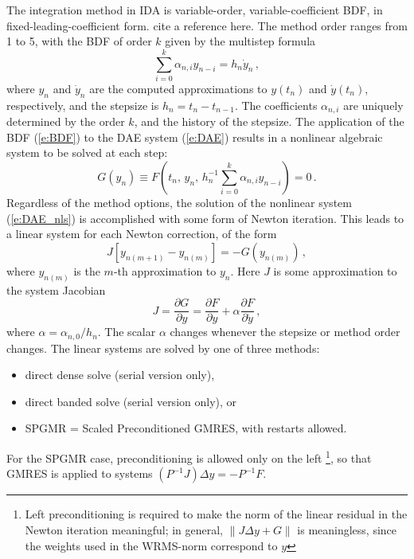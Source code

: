 The integration method in IDA is variable-order, variable-coefficient
BDF, in fixed-leading-coefficient form.  {\sf cite a reference here.} 
The method order ranges from 1 to 5, with the BDF of order $k$
given by the multistep formula
\begin{equation}\label{e:BDF}
  \sum_{i=0}^k \alpha_{n,i}y_{n-i} = h_n {\dot y}_n \, ,
\end{equation}
where $y_n$ and ${\dot y}_n$ are the computed approximations to $y(t_n)$
and ${\dot y}(t_n)$, respectively, and the stepsize is $h_n = t_n - t_{n-1}$.  
The coefficients $\alpha_{n,i}$ are uniquely determined by the order
$k$, and the history of the stepsize.  The application of the BDF
(\ref{e:BDF}) to the DAE system (\ref{e:DAE}) results in a nonlinear
algebraic system to be solved at each step:
\begin{equation}\label{e:DAE_nls}
  G(y_n) \equiv 
  F \left( t_n , \, y_n , \, 
    h_n^{-1} \sum_{i=0}^k \alpha_{n,i}y_{n-i} \right) = 0 \, .
\end{equation}
%
Regardless of the method options, the solution of the nonlinear system
(\ref{e:DAE_nls}) is accomplished with some form of Newton iteration.
This leads to a linear system for each Newton correction, of the form
\begin{equation}\label{e:DAE_Newtoncorr}
  J [y_{n(m+1)} - y_{n(m)}] = -G(y_{n(m)})  \, , 
\end{equation}
where $y_{n(m)}$ is the $m$-th approximation to $y_n$. 
%
Here $J$ is some approximation to the system Jacobian
\begin{equation}\label{e:DAE_Jacobian}
  J = \frac{\partial G}{\partial y}
  = \frac{\partial F}{\partial y} + 
  \alpha\frac{\partial F}{\partial {\dot y}} \, ,
\end{equation}
where $\alpha = \alpha_{n,0}/h_n$.  The scalar $\alpha$ changes 
whenever the stepsize or method order changes.
%
The linear systems are solved by one of three methods:
\begin{itemize}
\item direct dense solve (serial version only),
\item direct banded solve (serial version only), or
\item SPGMR = Scaled Preconditioned GMRES, with restarts allowed.
\end{itemize}
For the SPGMR case, preconditioning is allowed only on the left
\footnote{Left preconditioning is required to make the norm of the 
linear residual in the Newton iteration meaningful; in general,
$\| J \Delta y + G \|$ is meaningless, since the weights used in 
the WRMS-norm correspond to $y$}, 
so that GMRES is applied to systems $(P^{-1}J)\Delta y = -P^{-1}F$. 

